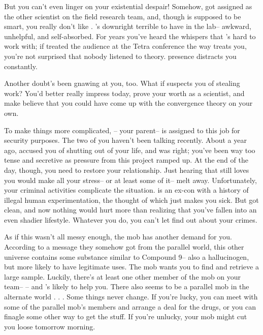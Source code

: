 \documentclass[char]{guildcamp3}
\begin{document}
But you can't even linger on your existential despair! Somehow, \cSciTwo{} got assigned as the other scientist on the field research team, and, though \cSciTwo{\they} is supposed to be smart, you really don't like \cSciTwo{\them}. \cSciTwo{\they}'s downright terrible to have in the lab-- awkward, unhelpful, and self-absorbed. For years you've heard the whispers that \cSciTwo{\they}'s hard to work with; if \cSciTwo{\they} treated the audience at the Tetra conference the way \cSciTwo{\they} treats you, you're not surprised that nobody listened to \cSciTwo{\their} theory. \cSciTwo{\Their} presence distracts you constantly.

Another doubt's been gnawing at you, too. What if \cSciTwo{\they} suspects you of stealing \cSciTwo{\their} work? You'd better really impress \cSciTwo{\them} today, prove your worth as a scientist, and make \cSciTwo{\them} believe that you could have come up with the convergence theory on your own.

To make things more complicated, \cSpecOpOne{\intro}-- your parent-- is assigned to this job for security purposes. The two of you haven't been talking recently. About a year ago, \cSpecOpOne{\they} accused you of shutting \cSpecOpOne{\them} out of your life, and \cSpecOpOne{\they} was right; you've been way too tense and secretive as pressure from this project ramped up. At the end of the day, though, you need to restore your relationship. Just hearing that \cSpecOpOne{\they} still loves you would make all your stress-- or at least some of it-- melt away. Unfortunately, your criminal activities complicate the situation. \cSpecOpOne{} is an ex-con with a history of illegal human experimentation, the thought of which just makes you sick. But\cSpecOpOne{\they} got clean, and now nothing would hurt \cSpecOpOne{\them} more than realizing that you've fallen into an even shadier lifestyle. Whatever you do, you can't let \cSpecOpOne{\them} find out about your crimes.

As if this wasn't all messy enough, the mob has another demand for you. According to a message they somehow got from the parallel world, this other universe contains some substance similar to Compound 9-- also a hallucinogen, but more likely to have legitimate uses. The mob wants you to find and retrieve a large sample. Luckily, there's at least one other member of the mob on your team-- \cSpecOpTwo{\intro}-- and \cSpecOpTwo{\they}'s likely to help you. There also seems to be a parallel mob in the alternate world . . . Some things never change. If you're lucky, you can meet with some of the parallel mob's members and arrange a deal for the drugs, or you can finagle some other way to get the stuff. If you're unlucky, your mob might cut you loose tomorrow morning.
\end{document}
